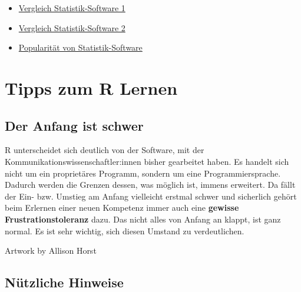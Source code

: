 \documentclass[
]{book}
\providecommand{\tightlist}{%
  \setlength{\itemsep}{0pt}\setlength{\parskip}{0pt}}
\begin{document}
\begin{itemize}
\tightlist
\item
  \href{https://www.inwt-statistics.de/blog-artikel-lesen/Statistik-Software-R_Python_SAS_SPSS_STATA_im_Vergleich.html}{Vergleich Statistik-Software 1}
\item
  \href{https://novustat.com/statistik-blog/statistikprogramm-ueberblick.html}{Vergleich Statistik-Software 2}
\item
  \href{http://r4stats.com/articles/popularity/}{Popularität von Statistik-Software}
\end{itemize}

\hypertarget{tipps-zum-r-lernen}{%
\section{Tipps zum R Lernen}\label{tipps-zum-r-lernen}}

\hypertarget{der-anfang-ist-schwer}{%
\subsection{Der Anfang ist schwer}\label{der-anfang-ist-schwer}}

R unterscheidet sich deutlich von der Software, mit der Kommunikationswissenschaftler:innen bisher gearbeitet haben. Es handelt sich nicht um ein proprietäres Programm, sondern um eine Programmiersprache. Dadurch werden die Grenzen dessen, was möglich ist, immens erweitert. Da fällt der Ein- bzw. Umstieg am Anfang vielleicht erstmal schwer und sicherlich gehört beim Erlernen einer neuen Kompetenz immer auch eine \textbf{gewisse Frustrationstoleranz} dazu. Das nicht alles von Anfang an klappt, ist ganz normal. Es ist sehr wichtig, sich diesen Umstand zu verdeutlichen.

Artwork by Allison Horst

\hypertarget{nuxfctzliche-hinweise}{%
\subsection{Nützliche Hinweise}\label{nuxfctzliche-hinweise}}
\end{document}
